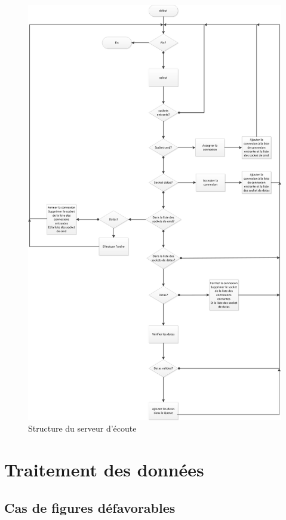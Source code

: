 \newpage
\begin{figure}[h!]
	\centering 
	\includegraphics[scale=0.6]{images/select.png}
	\caption{Structure du serveur d'écoute}
\end{figure}

\newpage

\section*{Traitement des données}


\subsection*{Cas de figures défavorables}

